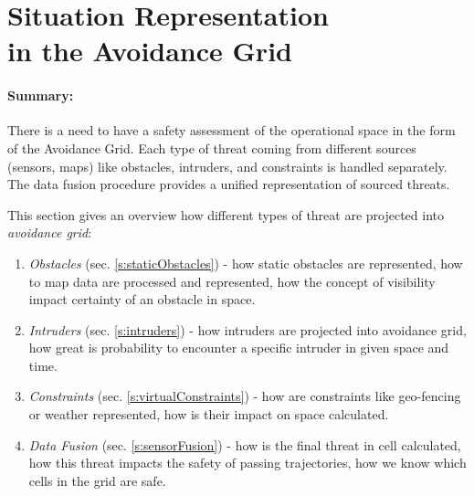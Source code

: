 \cleardoublepage
\section[Situation Representation in the Avoidance Grid]{Situation Representation \\in the Avoidance Grid}\label{sec:situationAssessment}

\paragraph{Summary:} There is a need to have a safety assessment of the operational space in the form of the Avoidance Grid. Each type of threat coming from different sources (sensors, maps) like obstacles, intruders, and constraints is handled separately. The data fusion procedure provides a unified representation of sourced threats.  

This section gives an overview how different types of threat are projected into \emph{avoidance grid}:

\begin{enumerate}
	\item\emph{Obstacles} (sec. \ref{s:staticObstacles}) - how static obstacles are represented, how to map data are processed and represented, how the concept of visibility impact certainty of an obstacle in space.
	
	\item\emph{Intruders} (sec. \ref{s:intruders}) - how intruders are projected into avoidance grid, how great is probability to encounter a specific intruder in given space and time.
	
	\item\emph{Constraints} (sec. \ref{s:virtualConstraints}) - how are constraints like geo-fencing or weather represented, how is their impact on space calculated.
	
	\item\emph{Data Fusion} (sec. \ref{s:sensorFusion}) - how is the final threat in cell calculated, how this threat impacts the safety of passing trajectories, how we know which cells in the grid are safe.
\end{enumerate}